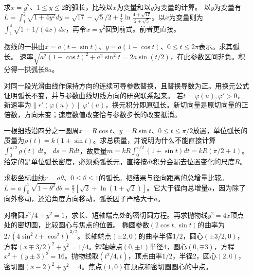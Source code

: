 求\(x=y^2\)、\(1\le y\le2\)的弧长，比较以\(x\)为变量和以\(y\)为变量的计算。
\solutionanswer
以\(y\)为变量有\(L=\int_1^2\sqrt{1+4y^2}dy=\sqrt{17}-\sqrt5/2+\frac14\ln\frac{4+\sqrt{17}}{2+\sqrt5}\)。以\(x\)为变量则为\(\int_1^4\sqrt{1+1/(4x)}dx\)，再令\(x=y^2\)回到前式。前者更直接。


摆线的一拱由\(x=a(t-\sin t)\)、\(y=a(1-\cos t)\)、\(0\le t\le2\pi\)表示。求其弧长。
\solutionanswer
速率\(\sqrt{a^2(1-\cos t)^2+a^2\sin^2t}=2a\sin(t/2)\)，在此参数区间非负。积分得一拱弧长\(8a\)。


对同一段光滑曲线作保持方向的连续可导参数替换，且替换导数为正。用换元公式证明弧长不变，并与参数曲线切线方向的研究联系起来。
\solutionanswer
若\(t=\varphi(u),\varphi'>0\)，新速率为\(\|r'(\varphi(u))\|\varphi'(u)\)，换元积分即原弧长。新切向量是原切向量的正倍数，方向未变；速度数值改变恰与参数步长的改变抵消。


一根细线沿四分之一圆周\(x=R\cos t\)、\(y=R\sin t\)、\(0\le t\le\pi/2\)放置，单位弧长的质量为\(\rho(t)=k(1+\sin t)\)。求总质量，并说明为什么不能直接计算\(\int_0^{\pi/2}\rho(t)\,dt\)。
\solutionanswer
\(ds=Rdt\)，故质量\(m=kR\int_0^{\pi/2}(1+\sin t)dt=kR(\pi/2+1)\)。给定的是单位弧长密度，必须乘弧长元，直接按\(dt\)积分会漏去位置变化的尺度\(R\)。


求极坐标曲线\(r=a\theta\)、\(0\le\theta\le1\)的弧长。把结果与径向距离的总增量比较。
\solutionanswer
\(L=a\int_0^1\sqrt{1+\theta^2}d\theta=\frac a2[\sqrt2+\ln(1+\sqrt2)]\)。它大于径向总增量\(a\)，因为除了向外移动，还沿角度方向移动，弧长因子严格大于\(a\)。


对椭圆\(x^2/4+y^2=1\)，求长、短轴端点处的密切圆方程。再求抛物线\(y^2=4x\)顶点处的密切圆，比较圆心与焦点的位置。
\solutionanswer
椭圆参数\((2\cos t,\sin t)\)的曲率为\(2/(4\sin^2t+\cos^2t)^{3/2}\)。长轴端点\((\pm2,0)\)的曲率半径\(1/2\)，圆心\((\pm3/2,0)\)，方程\((x\mp3/2)^2+y^2=1/4\)。短轴端点\((0,\pm1)\)半径\(4\)，圆心\((0,\mp3)\)，方程\(x^2+(y\pm3)^2=16\)。抛物线取\((t^2/4,t)\)，顶点曲率\(1/2\)，半径\(2\)，圆心\((2,0)\)，密切圆\((x-2)^2+y^2=4\)。焦点\((1,0)\)在顶点和密切圆圆心的中点。



